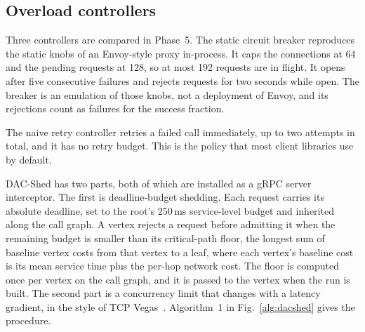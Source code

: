 \subsection{Overload controllers}
\label{sec:controllers}

Three controllers are compared in Phase~5. The static circuit breaker reproduces the static knobs of an Envoy-style proxy in-process. It caps the connections at 64 and the pending requests at 128, so at most 192 requests are in flight. It opens after five consecutive failures and rejects requests for two seconds while open. The breaker is an emulation of those knobs, not a deployment of Envoy, and its rejections count as failures for the success fraction.

The naive retry controller retries a failed call immediately, up to two attempts in total, and it has no retry budget. This is the policy that most client libraries use by default.

DAC-Shed has two parts, both of which are installed as a gRPC server interceptor. The first is deadline-budget shedding. Each request carries its absolute deadline, set to the root's 250\,ms service-level budget and inherited along the call graph. A vertex rejects a request before admitting it when the remaining budget is smaller than its critical-path floor, the longest sum of baseline vertex costs from that vertex to a leaf, where each vertex's baseline cost is its mean service time plus the per-hop network cost. The floor is computed once per vertex on the call graph, and it is passed to the vertex when the run is built. The second part is a concurrency limit that changes with a latency gradient, in the style of TCP Vegas~\cite{brakmo1994vegas}. Algorithm~1 in Fig.~\ref{alg:dacshed} gives the procedure.

